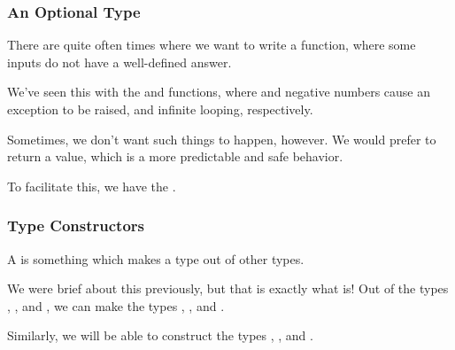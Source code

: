 \documentclass[aspectratio=169]{beamer}
\begin{document}
\begin{frame}[fragile]
  \frametitle{An Optional Type}

  There are quite often times where we want to write a function, where some inputs
  do not have a well-defined answer.

  \pause
  \vspace{\fill}

  We've seen this with the  and  functions, where  and 
  negative numbers cause an exception to be raised, and infinite looping, respectively.

  \pause
  \vspace{\fill}

  Sometimes, we don't want such things to happen, however. We would prefer to return
  a value, which is a more predictable and safe behavior.

  \pause
  \vspace{\fill}

  To facilitate this, we have the  . 
\end{frame}

\begin{frame}[fragile]
  \frametitle{Type Constructors}

  A  is something which makes a type out of other types. 

  \pause
  \vspace{\fill}

  We were brief about this previously, but that is exactly what  is!
  Out of the types , , and , we can make
  the types , , and .

  \pause
  \vspace{\fill}

  Similarly, we will be able to construct the types , ,
  and .
\end{frame}
\end{document}
